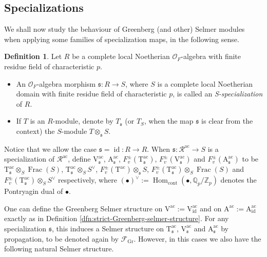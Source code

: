 \documentclass[12pt,reqno]{amsart}
\theoremstyle{definition}
\newtheorem{definition}[theorem]{Definition}
\theoremstyle{remark}
\newcommand{\numberset}{\mathbb}
\newcommand{\Q}{\numberset{Q}}
\newcommand{\Z}{\numberset{Z}}
\newcommand{\OF}{\mathcal{O}_F}
\newcommand{\V}{\boldsymbol{\mathrm{V}}}
\newcommand{\T}{\boldsymbol{\mathrm{T}}}
\newcommand{\calR}{\mathcal{R}}
\newcommand{\A}{\boldsymbol{\mathrm{A}}}
\DeclareMathOperator{\Hom}{Hom}
\DeclareMathOperator{\id}{id}
\DeclareMathOperator{\Frac}{Frac}
\newcommand{\ac}{\mathrm{ac}}
\newcommand{\Gr}{\mathrm{Gr}}
\newcommand{\cont}{\mathrm{cont}}
\newcommand{\sfrak}{\mathfrak{s}}
\begin{document}
\subsection{Specializations}

We shall now study the behaviour of Greenberg (and other) Selmer modules when applying some families of specialization maps, in the following sense.

\begin{definition}
    Let $R$ be a complete local Noetherian $\OF$-algebra with finite residue field of characteristic $p$.
    \begin{itemize}
        \item[(i)] An $\OF$-algebra morphism $\sfrak\colon R\to S$, where $S$ is a complete local Noetherian domain with finite residue field of characteristic $p$, is called an \emph{S-specialization} of $R$.
        \item[(ii)] If $T$ is an $R$-module, denote by $T_\sfrak$ (or $T_S$, when the map $\sfrak$ is clear from the context) the $S$-module $T\otimes_{\sfrak}S$.
    \end{itemize}
\end{definition}

Notice that we allow the case $\sfrak=\id\colon R\to R$. When $\sfrak\colon \calR^{\ac}\to S$ is a specialization of $\calR^\ac$, define $\V_{\mathfrak{s}}^{\ac}$, $\A_{\mathfrak{s}}^{\ac}$, $F_v^{\pm}(\T_{\mathfrak{s}}^{\ac})$, $F_v^{\pm}(\V_{\mathfrak{s}}^{\ac})$ and $F_v^{\pm}(\A_{\mathfrak{s}}^{\ac})$ to be $\T_{\mathfrak{s}}^\ac\otimes_S\Frac(S)$, $\T_{\mathfrak{s}}^\ac\otimes_S S^\vee$, $F_v^{\pm}(\T^\ac)\otimes_{\mathfrak{s}}S$, $F_v^{\pm}(\T_{\mathfrak{s}}^\ac)\otimes_S\Frac(S)$ and $F_v^{\pm}(\T_{\mathfrak{s}}^\ac)\otimes_S S^\vee$ respectively, where $(\bullet)^\vee:=\Hom_{\cont}(\bullet,\Q_p/\Z_p)$ denotes the Pontryagin dual of $\bullet$. 

One can define the Greenberg Selmer structure on $\V^\ac:=\V^\ac_{\id}$ and on $\A^\ac:=\A^\ac_{\id}$ exactly as in Definition \ref{dfn:strict-Greenberg-selmer-structure}. For any specialization $\sfrak$, this induces a Selmer structure on $\T_{\mathfrak{s}}^{\ac}$, $\V_{\mathfrak{s}}^{\ac}$ and $\A_{\mathfrak{s}}^{\ac}$ by propagation, to be denoted again by $\mathcal{F}_\Gr$. However, in this cases we also have the following natural Selmer structure.
\end{document}
